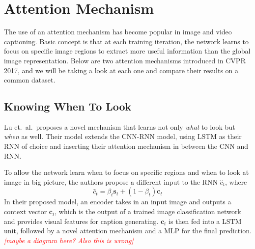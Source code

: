 \documentclass[10pt,twocolumn,letterpaper]{article}
\newcommand{\todo}[1]{\textcolor{red}{{\em [#1]}} }
\newcommand{\bs}[1]{\boldsymbol{#1}}
\begin{document}
\section{Attention Mechanism}

The use of an attention mechanism has become popular in image and video
captioning. Basic concept is that at each training iteration, the network
learns to focus on specific image regions to extract more useful information
than the global image representation. Below are two attention mechanisms
introduced in CVPR 2017, and we will be taking a look at each one and compare
their results on a common dataset.

\subsection{Knowing When To Look}
Lu et.\ al.\ proposes a novel mechanism that learns not only \textit{what} to
look but \textit{when} as well. Their model extends the CNN-RNN model,
using LSTM as their RNN of choice and inserting their attention mechanism in
between the CNN and RNN.

To allow the network learn when to focus on specific regions and when to look
at image in big picture, the authors propose a different input to the RNN
$\hat{c}_t$, where
%
\begin{equation}
  \hat{c}_t = \beta_t \bm{s}_t + (1 - \beta_t) \bm{c}_t
\end{equation}
%
In their proposed model, an
encoder takes in an input image and outputs a context vector $\bs{c}_t$, which
is the output of a trained image classification network and provides visual
features for caption generating.  $\bs{c}_t$ is then fed into a LSTM unit,
followed by a novel attention mechanism and a MLP for the final prediction.
\todo{maybe a diagram here? Also
this is wrong}
\end{document}
